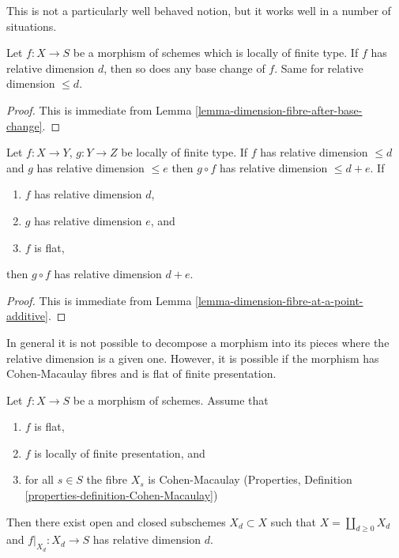 \noindent
This is not a particularly well behaved notion, but it works well
in a number of situations.

\begin{lemma}
\label{lemma-base-change-relative-dimension-d}
Let $f : X \to S$ be a morphism of schemes which is locally of finite type.
If $f$ has relative dimension $d$, then so does any base change of $f$.
Same for relative dimension $\leq d$.
\end{lemma}

\begin{proof}
This is immediate from
Lemma \ref{lemma-dimension-fibre-after-base-change}.
\end{proof}

\begin{lemma}
\label{lemma-composition-relative-dimension-d}
Let $f : X \to Y$, $g : Y \to Z$ be locally of finite type.
If $f$ has relative dimension $\leq d$ and $g$ has relative dimension $\leq e$
then $g \circ f$ has relative dimension $\leq d + e$.
If
\begin{enumerate}
\item $f$ has relative dimension $d$,
\item $g$ has relative dimension $e$, and
\item $f$ is flat,
\end{enumerate}
then $g \circ f$ has relative dimension $d + e$.
\end{lemma}

\begin{proof}
This is immediate from Lemma \ref{lemma-dimension-fibre-at-a-point-additive}.
\end{proof}

\noindent
In general it is not possible to decompose a morphism
into its pieces where the relative dimension is a given
one. However, it is possible if the morphism has Cohen-Macaulay
fibres and is flat of finite presentation.

\begin{lemma}
\label{lemma-flat-finite-presentation-CM-fibres-relative-dimension}
Let $f : X \to S$ be a morphism of schemes.
Assume that
\begin{enumerate}
\item $f$ is flat,
\item $f$ is locally of finite presentation, and
\item for all $s \in S$ the fibre $X_s$ is Cohen-Macaulay
(Properties, Definition \ref{properties-definition-Cohen-Macaulay})
\end{enumerate}
Then there exist open and closed subschemes $X_d \subset X$
such that $X = \coprod_{d \geq 0} X_d$ and $f|_{X_d} : X_d \to S$
has relative dimension $d$.
\end{lemma}

